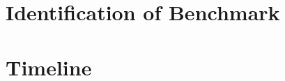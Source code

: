 \documentclass{article}
\begin{document}

\section{Identification of Benchmark}


\section{Timeline}




\end{document}
